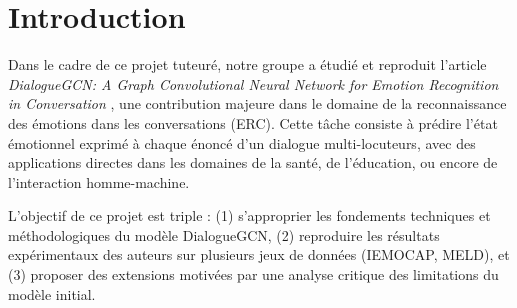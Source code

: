 \documentclass[a4paper,11pt]{article}
\begin{document}













\tableofcontents
\listoffigures
{}

\listoftables
{}
\newpage









\section{Introduction}

Dans le cadre de ce projet tuteuré, notre groupe a étudié et reproduit l'article \textit{DialogueGCN: A Graph Convolutional Neural Network for Emotion Recognition in Conversation} \cite{ghosal2019dialoguegcn}, une contribution majeure dans le domaine de la reconnaissance des émotions dans les conversations (ERC). Cette tâche consiste à prédire l’état émotionnel exprimé à chaque énoncé d’un dialogue multi-locuteurs, avec des applications directes dans les domaines de la santé, de l’éducation, ou encore de l’interaction homme-machine.

L’objectif de ce projet est triple : (1) s’approprier les fondements techniques et méthodologiques du modèle DialogueGCN, (2) reproduire les résultats expérimentaux des auteurs sur plusieurs jeux de données (IEMOCAP, MELD), et (3) proposer des extensions motivées par une analyse critique des limitations du modèle initial.
\end{document}
